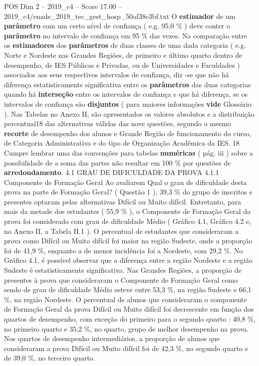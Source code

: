 \begin{textsample}{POS Dim 2 – 2019\_c4 – Score 17.00 – 2019\_c4/enade\_2019\_tec\_gest\_hosp\_50af38c3bf.txt}
O \textbf{estimador} de um \textbf{parâmetro} com um certo nível de confiança ( e.g. 95,0 \% ) deve conter o \textbf{parâmetro} no intervalo de confiança em 95 \% das vezes.
Na comparação entre os \textbf{estimadores} dos \textbf{parâmetros} de duas classes de uma dada categoria ( e.g.
Norte e Nordeste nas Grandes Regiões, de primeiro e último quarto dentro de desempenho, de IES Públicas e Privadas, ou de Universidades e Faculdades ) associados aos seus respectivos intervalos de confiança, diz -se que não há diferença estatisticamente significativa entre os \textbf{parâmetros} das duas categorias quando há \textbf{interseção} entre os intervalos de confiança e que há diferença, se os intervalos de confiança são \textbf{disjuntos} ( para maiores informações \textbf{vide} Glossário ).
Nas Tabelas no Anexo II, são apresentados os valores absolutos e a distribuição percentual18 das alternativas válidas das nove questões, segundo o mesmo \textbf{recorte} de desempenho dos alunos e Grande Região de funcionamento do curso, de Categoria Administrativa e do tipo de Organização Acadêmica da IES. 18 Cumpre lembrar uma das convenções para tabelas \textbf{numéricas} ( pág. iii ) sobre a possibilidade de a soma das partes não resultar em 100 \% por questões de \textbf{arredondamento}. 4.1 GRAU DE DIFICULDADE DA PROVA 4.1.1 Componente de Formação Geral Ao avaliarem Qual o grau de dificuldade desta prova na parte de Formação Geral? ( Questão 1 ), 39,3 \% do grupo de inscritos e presentes optaram pelas alternativas Difícil ou Muito difícil.
Entretanto, para mais da metade dos estudantes ( 55,9 \% ), o Componente de Formação Geral da prova foi considerado com grau de dificuldade Médio ( Gráfico 4.1, Gráfico 4.2 e, no Anexo II, a Tabela II.1 ).
O percentual de estudantes que consideraram a prova como Difícil ou Muito difícil foi maior na região Sudeste, onde a proporção foi de 41,9 \%, enquanto a de menor incidência foi a Nordeste, com 29,2 \%.
No Gráfico 4.1, é possível observar que a diferença entre a região Nordeste e a região Sudeste é estatisticamente significativa.
Nas Grandes Regiões, a proporção de presentes à prova que consideraram o Componente de Formação Geral como sendo de grau de dificuldade Médio esteve entre 53,3 \%, na região Sudeste e 66,1 \%, na região Nordeste.
O percentual de alunos que consideraram o componente de Formação Geral da prova Difícil ou Muito difícil foi decrescente em função dos quartos de desempenho, com exceção do primeiro para o segundo quarto : 40,8 \%, no primeiro quarto e 35,2 \%, no quarto, grupo de melhor desempenho na prova.
Nos quartos de desempenho intermediários, a proporção de alunos que consideraram a prova Difícil ou Muito difícil foi de 42,3 \%, no segundo quarto e de 39,0 \%, no terceiro quarto.

\end{textsample}
